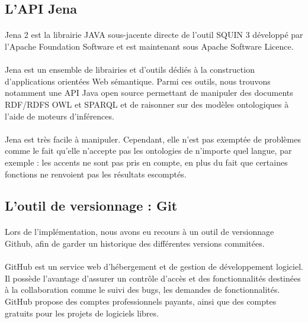 \documentclass[12pt, a4paper, oneside]{book}
\begin{document}
\subsection{L'API Jena}
\paragraph{}
Jena 2 est la librairie JAVA sous-jacente directe de l'outil SQUIN 3 développé par l'Apache Foundation Software et est maintenant sous Apache Software Licence. 
\paragraph{}
Jena est un ensemble de librairies et d'outils dédiés à la construction d'applications orientées Web sémantique. Parmi ces outils, nous trouvons notamment une API Java open source permettant de manipuler des documents
RDF/RDFS OWL et SPARQL et de raisonner sur des modèles ontologiques à l'aide de moteurs d'inférences. 
\paragraph{}
Jena est très facile à manipuler. Cependant, elle n'est pas exemptée de problèmes comme le fait qu'elle n'accepte pas les ontologies de n'importe quel langue, par exemple : les accents ne sont pas pris en compte, en plus du fait que certaines fonctions ne renvoient pas les résultats escomptés.

\subsection{L'outil de versionnage : Git}
\paragraph{}
Lors de l'implémentation, nous avons eu recours à un outil de versionnage Github, afin de garder un historique des différentes versions commitées.
\paragraph{}
GitHub est un service web d'hébergement et de gestion de développement logiciel. Il possède l'avantage d'assurer un contrôle d'accès et des fonctionnalités destinées à la collaboration comme le suivi des bugs, les demandes de fonctionnalités. GitHub propose des comptes professionnels payants, ainsi que des comptes gratuits pour les projets de logiciels libres.
\end{document}
